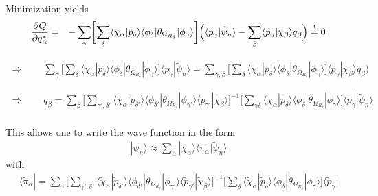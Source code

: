 \documentclass[11pt,a4paper]{report}
\begin{document}
Minimization yields
\begin{eqnarray}
\frac{\partial Q}{\partial q^*_\alpha}
&=&
-\sum_{\gamma}
\biggl[
\sum_{\delta}
\langle\tilde{\chi}_\alpha|\tilde{p}_\delta\rangle
\langle\phi_\delta|\theta_{\Omega_{R_\delta}}|\phi_\gamma\rangle
\biggr]
\Bigl(\langle\tilde{p}_\gamma|\tilde{\psi}_n\rangle
-\sum_\beta \langle\tilde{p}_\gamma|\tilde{\chi}_\beta\rangle q_\beta\Bigr)
\stackrel{!}{=}0
\nonumber
\end{eqnarray}


\begin{eqnarray}
\Rightarrow\qquad\sum_{\gamma}
\biggl[
\sum_{\delta}
\langle\tilde{\chi}_\alpha|\tilde{p}_\delta\rangle
\langle\phi_\delta|\theta_{\Omega_{R_\delta}}|\phi_\gamma\rangle
\biggr]
\langle\tilde{p}_\gamma|\tilde{\psi}_n\rangle
=
\sum_{\gamma,\beta}
\biggl[
\sum_{\delta}
\langle\tilde{\chi}_\alpha|\tilde{p}_\delta\rangle
\langle\phi_\delta|\theta_{\Omega_{R_\delta}}|\phi_\gamma\rangle
\biggr]
\langle\tilde{p}_\gamma|\tilde{\chi}_\beta\rangle q_\beta\Bigr)
\nonumber
\end{eqnarray}

\begin{eqnarray}
\Rightarrow\qquad
q_\beta=
\sum_{\beta}
\biggl[
\sum_{\gamma',\delta'}
\langle\tilde{\chi}_\alpha|\tilde{p}_{\delta'}\rangle
\langle\phi_{\delta'}|\theta_{\Omega_{R_\delta}}|\phi_{\gamma'}\rangle
\langle\tilde{p}_{\gamma'}|\tilde{\chi}_\beta\rangle 
\biggr]^{-1}
\biggl[
\sum_{\gamma\delta}
\langle\tilde{\chi}_\alpha|\tilde{p}_\delta\rangle
\langle\phi_\delta|\theta_{\Omega_{R_\delta}}|\phi_\gamma\rangle
\biggr]
\langle\tilde{p}_\gamma|\tilde{\psi}_n\rangle
\nonumber\\
\end{eqnarray}


This allows one to write the wave function in the form
\begin{eqnarray}
|\psi_n\rangle\approx
\sum_\alpha|\chi_\alpha\rangle\langle\tilde{\pi}_\alpha|\tilde{\psi}_n\rangle
\end{eqnarray}
with
\begin{eqnarray}
\langle\tilde{\pi}_\alpha|=
\sum_\gamma \biggl[
\sum_{\gamma',\delta'}
\langle\tilde{\chi}_\alpha|\tilde{p}_{\delta'}\rangle
\langle\phi_{\delta'}|\theta_{\Omega_{R_\delta}}|\phi_{\gamma'}\rangle
\langle\tilde{p}_{\gamma'}|\tilde{\chi}_\beta\rangle 
\biggr]^{-1}
\biggl[
\sum_{\delta}
\langle\tilde{\chi}_\alpha|\tilde{p}_\delta\rangle
\langle\phi_\delta|\theta_{\Omega_{R_\delta}}|\phi_\gamma\rangle
\biggr]
\langle\tilde{p}_\gamma|
\label{eq:pitilde}
\end{eqnarray}
\end{document}
